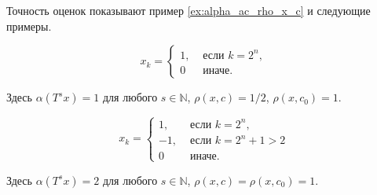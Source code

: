 Точность оценок показывают пример \ref{ex:alpha_ac_rho_x_c} и следующие примеры.
\begin{example}
	\begin{equation}
		x_k = \begin{cases}
			1, &\mbox{~если~} k = 2^n,
			\\
			0 &\mbox{~иначе.}
		\end{cases}
	\end{equation}
\end{example}
Здесь $\alpha(T^s x) = 1$ для любого $s\in\mathbb{N}$, $\rho(x,c) = 1/2$, $\rho(x, c_0) = 1$.

\begin{example}
	\begin{equation}
		x_k = \begin{cases}
			1, &\mbox{~если~} k = 2^n,
			\\
			-1, &\mbox{~если~} k = 2^n + 1 > 2
			\\
			0 &\mbox{~иначе.}
		\end{cases}
	\end{equation}
\end{example}
Здесь $\alpha(T^s x) = 2$ для любого $s\in\mathbb{N}$, $\rho(x,c) = \rho(x, c_0) = 1$.
